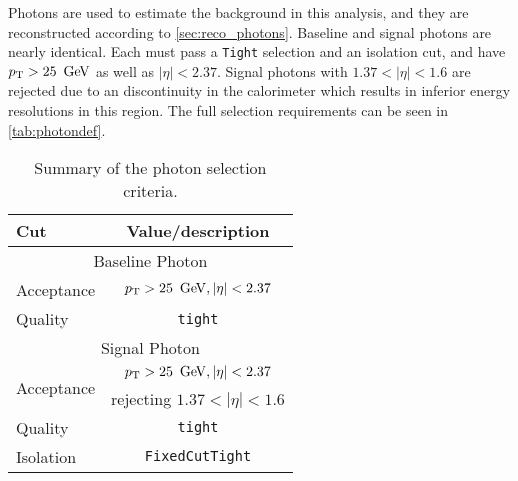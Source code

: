 Photons are used to estimate the \dyjets background in this analysis, and they are reconstructed according to \autoref{sec:reco_photons}. Baseline and signal photons are nearly identical. Each must pass a \texttt{Tight} selection and an isolation cut, and have $\pt > 25\,\GeV$ as well as $|\eta| < 2.37$. Signal photons with $1.37<|\eta|<1.6$ are rejected due to an discontinuity in the calorimeter which results in inferior energy resolutions in this region. The full selection requirements can be seen in \autoref{tab:photondef}.

\begin{table}[ph!]
  \begin{center}
    \begin{tabular}{l|c}
      \hline
      Cut            & Value/description \\
      \hline
      \hline
      \multicolumn{2}{c}{Baseline Photon}\\
      \hline
      Acceptance        & $\pt > 25\,\GeV, |\eta| < 2.37$   \\
      Quality        & \texttt{tight}    \\
      \hline
      \multicolumn{2}{c}{Signal Photon}\\
      \hline
      \multirow{2}{*}{Acceptance}     & $\pt > 25\,\GeV, |\eta| < 2.37$ \\
                     & rejecting $1.37<|\eta|<1.6$\\
      Quality        & \texttt{tight}    \\
      Isolation        & \texttt{FixedCutTight} \\
      \hline      
      \hline
    \end{tabular}
  \caption{Summary of the photon selection criteria.}            
    \label{tab:photondef}
  \end{center}
\end{table}

